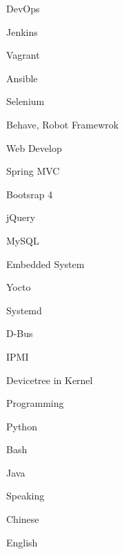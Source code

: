 

\begin{cvskills}

  \cvskill
    {DevOps} %
    {
      \begin{cvitems}
        \item {Jenkins}
        \item {Vagrant}
        \item {Ansible}
        \item {Selenium}
        \item {Behave, Robot Framewrok}
      \end{cvitems}
    } %

  \cvskill
    {Web Develop} %
    {
      \begin{cvitems}
        \item {Spring MVC}
        \item {Bootsrap 4}
        \item {jQuery}
        \item {MySQL}
      \end{cvitems}
    } %

 \cvskill
    {Embedded System} %
    {
      \begin{cvitems}
        \item {Yocto}
        \item {Systemd}
        \item {D-Bus}
        \item {IPMI}
        \item {Devicetree in Kernel}
      \end{cvitems}
    } %

  \cvskill
    {Programming} %
    {
      \begin{cvitems}
        \item {Python}
        \item {Bash}
        \item {Java}
      \end{cvitems}
    } %

  \cvskill
    {Speaking} %
    {
      \begin{cvitems}
        \item {Chinese}
        \item {English}
      \end{cvitems}
    } %

\end{cvskills}
